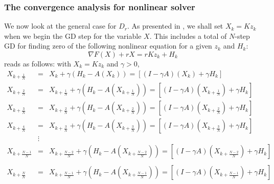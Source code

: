 \subsubsection{The convergence analysis for nonlinear solver}
We now look at the general case for $D_r$. As presented in \cite{mishchenko2022proxskip}, we shall set $X_k = Kz_k$ when we begin the GD step for the variable $X$. This includes a total of $N$-step GD for finding zero of the following nonlinear equation for a given $z_k$ and $H_k$:
\begin{equation} 
\nabla F(X) + r X = rKz_k + H_k 
\end{equation} 
reads as follows: with $X_k = Kz_k$ and $\gamma > 0$,   
\begin{eqnarray*} 
X_{k+\frac{1}{N}} &=& X_{k} + \gamma (H_k - A(X_k)) = [(I - \gamma A)(X_k) + \gamma H_k] \\ 
X_{k+\frac{2}{N}} &=& X_{k+\frac{1}{N}} + \gamma (H_k - A(X_{k+\frac{1}{N}})) = [(I - \gamma A)(X_{k+\frac{1}{N}}) + \gamma H_k] \\ 
X_{k+\frac{3}{N}} &=& X_{k+\frac{2}{N}} + \gamma (H_k - A(X_{k+\frac{2}{N}})) = [(I - \gamma A)(X_{k+\frac{2}{N}}) + \gamma H_k] \\ 
X_{k+\frac{4}{N}} &=& X_{k+\frac{3}{N}} + \gamma (H_k - A(X_{k+\frac{3}{N}})) =  [(I - \gamma A)(X_{k+\frac{3}{N}}) + \gamma H_k] \\
&\vdots& \\  
X_{k+\frac{N-1}{N}} &=& X_{k+\frac{N-2}{N}} + \gamma (H_k - A(X_{k+\frac{N-2}{N}})) =  [(I - \gamma A)(X_{k+\frac{N-2}{N}}) + \gamma H_k] \\  \\
X_{k+\frac{N}{N}} &=& X_{k+\frac{N-1}{N}} + \gamma (H_k - A(X_{k+\frac{N-1}{N}})) = [(I - \gamma A)(X_{k+\frac{N-1}{N}}) + \gamma H_k] \\ 
\end{eqnarray*}
